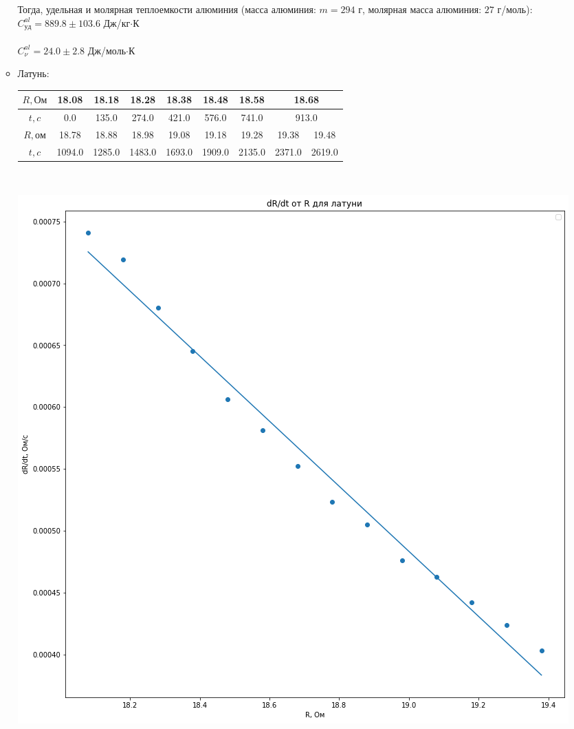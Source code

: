 \documentclass[12pt,a4paper]{article}
\begin{document}
\begin{enumerate}
\begin{itemize}
				Тогда, удельная и молярная теплоемкости алюминия (масса алюминия: $m = 294$ г, молярная масса алюминия: $27$ г/моль): \\
				
				$C_{уд}^{al} = 889.8 \pm 103.6$ Дж/кг$\cdot$К \\ \\
				$C_{\nu}^{al} = 24.0 \pm 2.8$ Дж/моль$\cdot$К \\	
				
			\item Латунь: \\
			
				\begin{tabular}{|c|c|c|c|c|c|c|c|c|} \hline
				$R, Ом$ & 18.08 & 18.18 & 18.28 & 18.38 & 18.48 & 18.58 & \multicolumn{2}{|c|}{18.68} \\ \hline
					$t, c$ & 0.0 & 135.0 & 274.0 & 421.0 & 576.0 & 741.0 & \multicolumn{2}{|c|}{913.0} \\ \hline
					$R, ом$ & 18.78 & 18.88 & 18.98 & 19.08 & 19.18 & 19.28 & 19.38 & 19.48 \\ \hline
					$t, c$ & 1094.0 & 1285.0 & 1483.0 & 1693.0 & 1909.0 & 2135.0 & 2371.0 & 2619.0 \\ \hline
				\end{tabular} \\	
				
				\begin{center}
					\includegraphics[scale=0.5]{g3.png}
				\end{center}
				

\end{itemize}
\end{enumerate}
\end{document}
